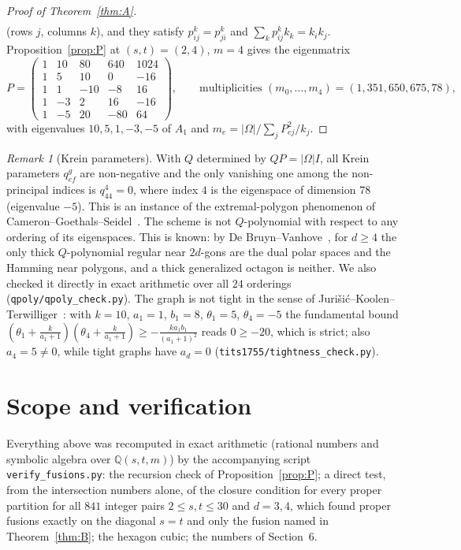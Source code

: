 \documentclass[11pt]{article}
\theoremstyle{remark}
\newtheorem{remark}[theorem]{Remark}
\begin{document}
\begin{proof}[Proof of Theorem~\ref{thm:A}]
\begin{equation}
\begin{gathered}
\end{gathered}
\end{equation}
(rows $j$, columns $k$), and they satisfy $p_{ij}^k=p_{ji}^k$ and $\sum_kp_{ij}^kk_k=k_ik_j$. Proposition~\ref{prop:P} at $(s,t)=(2,4)$, $m=4$ gives the eigenmatrix
\begin{equation}\label{eq:P}
P=\begin{pmatrix}1 & 10 & 80 & 640 & 1024 \\ 1 & 5 & 10 & 0 & -16 \\ 1 & 1 & -10 & -8 & 16 \\ 1 & -3 & 2 & 16 & -16 \\ 1 & -5 & 20 & -80 & 64\end{pmatrix},\qquad \text{multiplicities }(m_0,\dots,m_4)=(1,351,650,675,78),
\end{equation}
with eigenvalues $10,5,1,-3,-5$ of $A_1$ and $m_e=|\Omega|\big/\sum_jP_{ej}^2/k_j$.
\end{proof}

\begin{remark}[Krein parameters]
With $Q$ determined by $QP=|\Omega|I$, all Krein parameters $q_{ef}^g$ are non-negative and the only vanishing one among the non-principal indices is $q_{44}^{4}=0$, where index $4$ is the eigenspace of dimension $78$ (eigenvalue $-5$). This is an instance of the extremal-polygon phenomenon of Cameron--Goethals--Seidel~\cite{CGS}. The scheme is not $Q$-polynomial with respect to any ordering of its eigenspaces. This is known: by De Bruyn--Vanhove~\cite{DBV}, for $d\ge4$ the only thick $Q$-polynomial regular near $2d$-gons are the dual polar spaces and the Hamming near polygons, and a thick generalized octagon is neither. We also checked it directly in exact arithmetic over all $24$ orderings (\texttt{qpoly/qpoly\_check.py}). The graph is not tight in the sense of Juri\v{s}i\'c--Koolen--Terwilliger~\cite{JKT}: with $k=10$, $a_1=1$, $b_1=8$, $\theta_1=5$, $\theta_4=-5$ the fundamental bound $(\theta_1+\tfrac{k}{a_1+1})(\theta_4+\tfrac{k}{a_1+1})\ge-\tfrac{ka_1b_1}{(a_1+1)^2}$ reads $0\ge-20$, which is strict; also $a_4=5\ne0$, while tight graphs have $a_d=0$ (\texttt{tits1755/tightness\_check.py}).
\end{remark}

\section{Scope and verification}\label{sec:scope}

Everything above was recomputed in exact arithmetic (rational numbers and symbolic algebra over $\mathbb Q(s,t,m)$) by the accompanying script \texttt{verify\_fusions.py}: the recursion check of Proposition~\ref{prop:P}; a direct test, from the intersection numbers alone, of the closure condition for every proper partition for all $841$ integer pairs $2\le s,t\le30$ and $d=3,4$, which found proper fusions exactly on the diagonal $s=t$ and only the fusion named in Theorem~\ref{thm:B}; the hexagon cubic; the numbers of Section~6.
\end{document}

